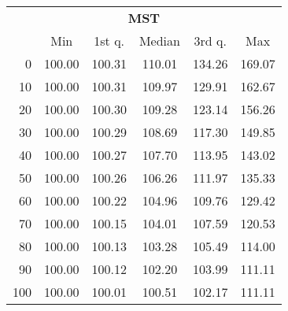\begin{tabular}{r|ccccc}
  \multicolumn{6}{c}{{\bf MST}} \\
  & Min & 1st q. & Median & 3rd q. & Max \\ \hline\hline
  0 & 100.00 & 100.31 & 110.01 & 134.26 & 169.07
\\ 10 & 100.00 & 100.31 & 109.97 & 129.91 & 162.67
\\ 20 & 100.00 & 100.30 & 109.28 & 123.14 & 156.26
\\ 30 & 100.00 & 100.29 & 108.69 & 117.30 & 149.85
\\ 40 & 100.00 & 100.27 & 107.70 & 113.95 & 143.02
\\ 50 & 100.00 & 100.26 & 106.26 & 111.97 & 135.33
\\ 60 & 100.00 & 100.22 & 104.96 & 109.76 & 129.42
\\ 70 & 100.00 & 100.15 & 104.01 & 107.59 & 120.53
\\ 80 & 100.00 & 100.13 & 103.28 & 105.49 & 114.00
\\ 90 & 100.00 & 100.12 & 102.20 & 103.99 & 111.11
\\ 100 & 100.00 & 100.01 & 100.51 & 102.17 & 111.11
\end{tabular}
